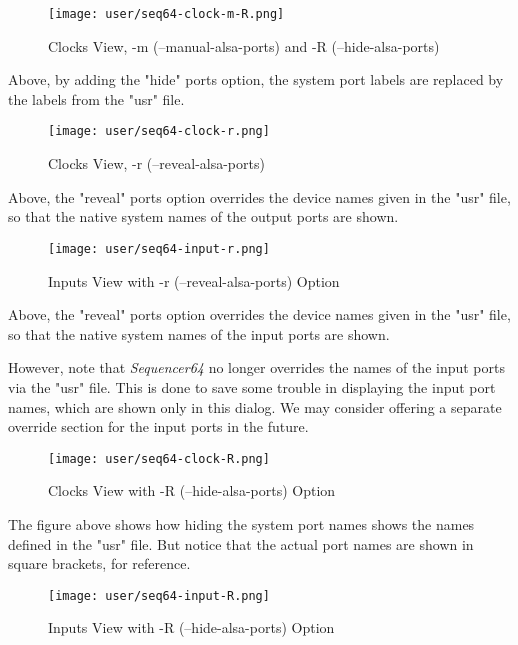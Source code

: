 \begin{figure}[H]
   \centering 
   \texttt{[image: user/seq64-clock-m-R.png]}
   \caption{Clocks View, -m (--manual-alsa-ports) and -R (--hide-alsa-ports)}
   \label{fig:seq64_clock_m_R}
\end{figure}

   Above, by adding the "hide" ports option, the system port labels are
   replaced by the labels from the "usr" file.

\begin{figure}[H]
   \centering 
   \texttt{[image: user/seq64-clock-r.png]}
   \caption{Clocks View, -r (--reveal-alsa-ports)}
   \label{fig:seq64_clock_r}
\end{figure}

   Above, the "reveal" ports option overrides the device names given in the
   "usr" file, so that the native system names of the output ports are shown.

\begin{figure}[H]
   \centering 
   \texttt{[image: user/seq64-input-r.png]}
   \caption{Inputs View with -r (--reveal-alsa-ports) Option}
   \label{fig:seq64_input_r}
\end{figure}

   Above, the "reveal" ports option overrides the device names given in the
   "usr" file, so that the native system names of the input ports are shown.

   However, note that \textsl{Sequencer64} no longer overrides the
   names of the input ports via the "usr" file.  This is done to
   save some trouble in displaying the input port names, which are shown
   only in this dialog.  We may consider offering a separate override section
   for the input ports in the future.

\begin{figure}[H]
   \centering 
   \texttt{[image: user/seq64-clock-R.png]}
   \caption{Clocks View with -R (--hide-alsa-ports) Option}
   \label{fig:seq64_clock_R}
\end{figure}

   The figure above shows how hiding the system port names shows the names
   defined in the "usr" file.  But notice that the actual port names are shown
   in square brackets, for reference.

\begin{figure}[H]
   \centering 
   \texttt{[image: user/seq64-input-R.png]}
   \caption{Inputs View with -R (--hide-alsa-ports) Option}
   \label{fig:seq64_input_R}
\end{figure}

